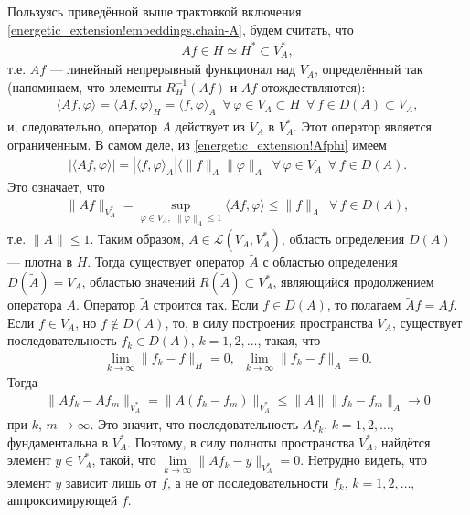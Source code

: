 \documentclass{report}
\begin{document}
Пользуясь приведённой выше трактовкой включения \eqref{energetic_extension!embeddings.chain-A}, будем считать, что
\begin{gather*}
Af\in H\simeq H^*\subset V^*_A,
\end{gather*}
т.е. $Af$ --- линейный непрерывный функционал над $V_A$, определённый так (напоминаем, что элементы $R^{-1}_H(Af)$ и $Af$ отождествляются):
\begin{gather}\label{energetic_extension!Afphi}
\langle Af,\varphi\rangle=\langle Af,\varphi\rangle_H=\langle f,\varphi\rangle_A\,\,\,\forall\,\varphi\in V_A\subset H\,\,\,\forall\,f\in D(A)\subset V_A,
\end{gather}
и, следовательно, оператор $A$ действует из $V_A$ в $V^*_A$. Этот оператор является ограниченным. В самом деле, из \eqref{energetic_extension!Afphi} имеем
\begin{gather*}
|\langle Af,\varphi\rangle|=|\langle f,\varphi\rangle_A|\langle\|f\|_A\|\varphi\|_A\,\,\,\forall\,\varphi\in V_A\,\,\,\forall\,f\in D(A).
\end{gather*}
Это означает, что
\begin{gather}\label{energetic_extension!Afnorm}
\|Af\|_{V^*_A}=\sup\limits_{\varphi\in V_A,\,\,\|\varphi\|_A\leqslant1}\langle Af,\varphi\rangle\leqslant\|f\|_A\,\,\,\forall\,f\in D(A),
\end{gather}
т.е. $\|A\|\leqslant1$. Таким образом, $A\in\mathcal{L}(V_A,V_A^*)$, область определения $D(A)$ --- плотна в $H$. Тогда существует оператор $\tilde{A}$ с областью определения $D(\tilde{A})=
V_A$, областью значений $R(\tilde{A})\subset V^*_A$, являющийся продолжением оператора $A$. Оператор $\tilde{A}$ строится так. Если $f\in D(A)$, то полагаем $\tilde{A}f=Af$. Если
$f\in V_A$, но $f\not\in D(A)$, то, в силу построения пространства $V_A$, существует последовательность $f_k\in D(A)$, $k=1,2,\dots$, такая, что
\begin{gather*}
\lim\limits_{k\to\infty}\|f_k-f\|_H=0,\,\,\,\lim\limits_{k\to\infty}\|f_k-f\|_A=0.
\end{gather*}
Тогда
\begin{gather*}
\|Af_k-Af_m\|_{V^*_A}=\|A(f_k-f_m)\|_{V^*_A}\leqslant\|A\|\|f_k-f_m\|_A\to0
\end{gather*}
при $k$, $m\to\infty$. Это значит, что последовательность $Af_k$, $k=1,2,\dots$, --- фундаментальна в $V^*_A$. Поэтому, в силу полноты пространства $V_A^*$, найдётся элемент $y\in V^*_A$,
такой, что $\lim\limits_{k\to\infty}\|Af_k-y\|_{V^*_A}=0$. Нетрудно видеть, что элемент $y$ зависит лишь от $f$, а не от последовательности $f_k$, $k=1,2,\dots$, аппроксимирующей $f$.
\end{document}
